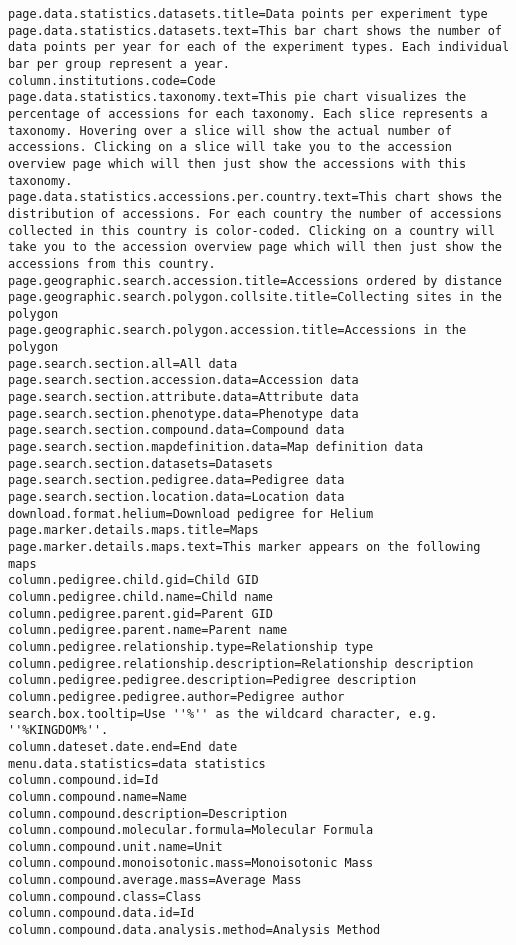 \begin{itemize}
\begin{lstlisting}[style=Properties]
page.data.statistics.datasets.title=Data points per experiment type
page.data.statistics.datasets.text=This bar chart shows the number of data points per year for each of the experiment types. Each individual bar per group represent a year.
column.institutions.code=Code
page.data.statistics.taxonomy.text=This pie chart visualizes the percentage of accessions for each taxonomy. Each slice represents a taxonomy. Hovering over a slice will show the actual number of accessions. Clicking on a slice will take you to the accession overview page which will then just show the accessions with this taxonomy.
page.data.statistics.accessions.per.country.text=This chart shows the distribution of accessions. For each country the number of accessions collected in this country is color-coded. Clicking on a country will take you to the accession overview page which will then just show the accessions from this country.
page.geographic.search.accession.title=Accessions ordered by distance
page.geographic.search.polygon.collsite.title=Collecting sites in the polygon
page.geographic.search.polygon.accession.title=Accessions in the polygon
page.search.section.all=All data
page.search.section.accession.data=Accession data
page.search.section.attribute.data=Attribute data
page.search.section.phenotype.data=Phenotype data
page.search.section.compound.data=Compound data
page.search.section.mapdefinition.data=Map definition data
page.search.section.datasets=Datasets
page.search.section.pedigree.data=Pedigree data
page.search.section.location.data=Location data
download.format.helium=Download pedigree for Helium
page.marker.details.maps.title=Maps
page.marker.details.maps.text=This marker appears on the following maps
column.pedigree.child.gid=Child GID
column.pedigree.child.name=Child name
column.pedigree.parent.gid=Parent GID
column.pedigree.parent.name=Parent name
column.pedigree.relationship.type=Relationship type
column.pedigree.relationship.description=Relationship description
column.pedigree.pedigree.description=Pedigree description
column.pedigree.pedigree.author=Pedigree author
search.box.tooltip=Use ''%'' as the wildcard character, e.g. ''%KINGDOM%''.
column.dateset.date.end=End date
menu.data.statistics=data statistics
column.compound.id=Id
column.compound.name=Name
column.compound.description=Description
column.compound.molecular.formula=Molecular Formula
column.compound.unit.name=Unit
column.compound.monoisotonic.mass=Monoisotonic Mass
column.compound.average.mass=Average Mass
column.compound.class=Class
column.compound.data.id=Id
column.compound.data.analysis.method=Analysis Method

\end{lstlisting}
\end{itemize}
